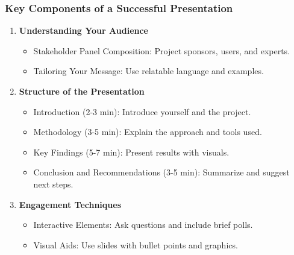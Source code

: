 \documentclass{beamer}
\begin{document}
\begin{frame}[fragile]
    \frametitle{Key Components of a Successful Presentation}
    
    \begin{enumerate}
        \item \textbf{Understanding Your Audience}
            \begin{itemize}
                \item Stakeholder Panel Composition: Project sponsors, users, and experts.
                \item Tailoring Your Message: Use relatable language and examples.
            \end{itemize}
        
        \item \textbf{Structure of the Presentation}
            \begin{itemize}
                \item Introduction (2-3 min): Introduce yourself and the project.
                \item Methodology (3-5 min): Explain the approach and tools used.
                \item Key Findings (5-7 min): Present results with visuals.
                \item Conclusion and Recommendations (3-5 min): Summarize and suggest next steps.
            \end{itemize}
        
        \item \textbf{Engagement Techniques}
            \begin{itemize}
                \item Interactive Elements: Ask questions and include brief polls.
                \item Visual Aids: Use slides with bullet points and graphics.
            \end{itemize}
    \end{enumerate}
\end{frame}
\end{document}
